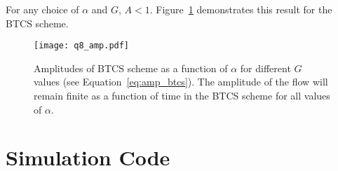 \documentclass{article}
\begin{document}
\begin{homeworkProblem}
{    For any choice of $\alpha$ and $G$, $A < 1$. Figure~\ref{fig:p8_amp}
    demonstrates this result for the BTCS scheme.}
    
    \begin{figure}[!ht] 
    \begin{center} 
        \texttt{[image: q8\_amp.pdf]} %

        \caption{\label{fig:p8_amp} Amplitudes of BTCS scheme as a function of
        $\alpha$ for different $G$ values (see Equation~\ref{eq:amp_btcs}).
        The amplitude of the flow will remain finite as a function of time in
        the BTCS scheme for all values of $\alpha$.}

    \end{center}
    \end{figure}



\end{homeworkProblem}
\clearpage


\section{Simulation Code}

\end{document}
